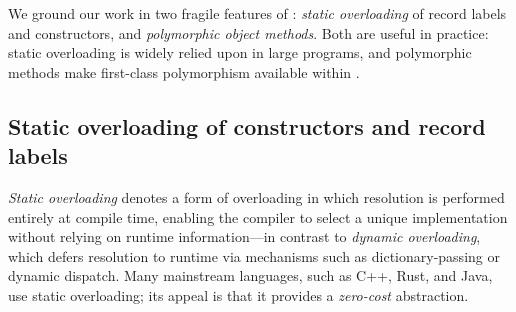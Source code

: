 \documentclass[acmsmall,screen,nonacm%
\Anonymous{,anonymous}{}%
\Final{}{,review}%
]{acmart}
\begin{document}
We ground our work in two fragile features of \OCaml: \emph{static overloading}
of record labels and constructors, and \emph{polymorphic object methods}. Both
are useful in practice: static overloading is widely relied upon in large
programs, and polymorphic methods make first-class polymorphism available
within \OCaml.

\subsection{Static overloading of constructors and record labels}
\label{sec/overview/overloading}


\emph{Static overloading} denotes a form of overloading in which resolution is
performed entirely at compile time, enabling the compiler to select a unique
implementation without relying on runtime information---in contrast to
\emph{dynamic overloading}, which defers resolution to runtime via mechanisms
such as dictionary-passing or dynamic dispatch. Many mainstream languages, such
as C++, Rust, and Java, use static overloading; its appeal is that it provides
a \emph{zero-cost} abstraction.

\end{document}
